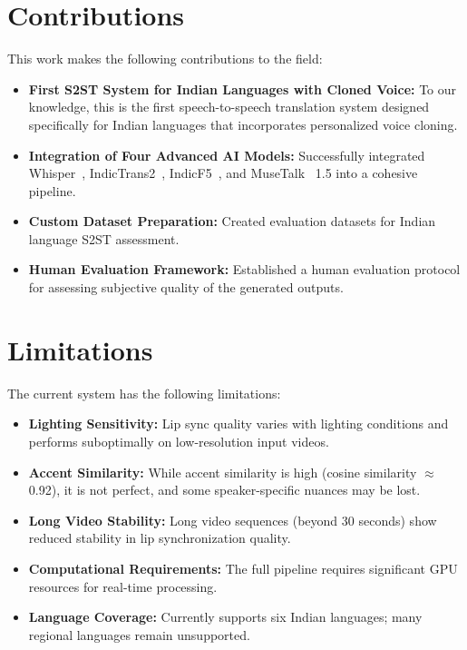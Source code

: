 \documentclass[12pt,oneside]{report}
\begin{document}
\section{Contributions}

This work makes the following contributions to the field:

\begin{itemize}
    \item \textbf{First S2ST System for Indian Languages with Cloned Voice:} To our knowledge, this is the first speech-to-speech translation system designed specifically for Indian languages that incorporates personalized voice cloning.
    
    \item \textbf{Integration of Four Advanced AI Models:} Successfully integrated Whisper~\cite{radford2023whisper}, IndicTrans2~\cite{gala2023indictrans2}, IndicF5~\cite{indicf5_2025}, and MuseTalk~\cite{zhang2023musetalk} 1.5 into a cohesive pipeline.
    
    \item \textbf{Custom Dataset Preparation:} Created evaluation datasets for Indian language S2ST assessment.
    
    \item \textbf{Human Evaluation Framework:} Established a human evaluation protocol for assessing subjective quality of the generated outputs.
\end{itemize}

\section{Limitations}

The current system has the following limitations:

\begin{itemize}
    \item \textbf{Lighting Sensitivity:} Lip sync quality varies with lighting conditions and performs suboptimally on low-resolution input videos.
    
    \item \textbf{Accent Similarity:} While accent similarity is high (cosine similarity $\approx$ 0.92), it is not perfect, and some speaker-specific nuances may be lost.
    
    \item \textbf{Long Video Stability:} Long video sequences (beyond 30 seconds) show reduced stability in lip synchronization quality.
    
    \item \textbf{Computational Requirements:} The full pipeline requires significant GPU resources for real-time processing.
    
    \item \textbf{Language Coverage:} Currently supports six Indian languages; many regional languages remain unsupported.
\end{itemize}
\end{document}
